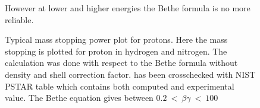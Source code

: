\begin{figure}[ht]
	
	\caption[Typical mass stopping power plot for protons]{Typical mass stopping power plot for protons. Here the mass stopping is plotted for proton in hydrogen and nitrogen.
		The calculation was done with respect to the Bethe formula without density and shell correction factor.
		has been crosschecked with NIST PSTAR table\cite{Seltzer1993} which contains both computed and experimental value.
		The Bethe equation gives between \(0.2\ <\ \beta\gamma\ <\ 100\)}
	However at lower and higher energies the Bethe formula is no more reliable.
	\label{chap3:bethe1}
\end{figure}
